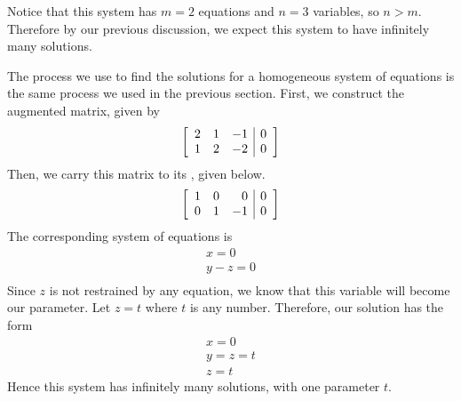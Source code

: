 \begin{solution}
Notice that this system has $m = 2$ equations and $n = 3$ variables, so $n>m$.
Therefore by our previous discussion, we expect this system to have infinitely many solutions. 

The process we use to find the solutions for a homogeneous system of equations
is the same process we used in the previous section. 
First, we construct the augmented matrix, given by 
\begin{equation*}
\left[
\begin{array}{rrr|r}
2 & 1 & -1 & 0 \\ 
1 & 2 & -2 & 0
\end{array}
\right]
\end{equation*}
Then, we carry this matrix to its {\rref}, given below. 
\begin{equation*}
\left[
\begin{array}{rrr|r}
1 & 0 & 0 & 0 \\ 
0 & 1 & -1 & 0
\end{array}
\right]
\end{equation*}
The corresponding system of equations is 
\begin{equation*}
\begin{array}{c}
x = 0 \\
y - z =0 \\
\end{array}
\end{equation*}
Since $z$ is not restrained by any equation, we know that this variable will become our parameter. 
Let $z=t$ where $t$ is any number. 
Therefore, our solution has the form
\begin{equation*}
\begin{array}{c}
x = 0 \\
y = z = t \\
z = t
\end{array}
\end{equation*}
Hence this system has infinitely many solutions, with one parameter $t$.
\end{solution}


